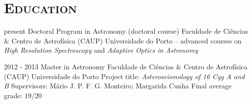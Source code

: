 \documentclass[10pt]{moderncv}
\begin{document}
%




\section{\textsc{Education}}

\cventry
	{present}
	{Doctoral Program in Astronomy (doctoral course)}
	{\newline Faculdade de Ciências \& Centro de Astrofísica (CAUP)}
	{Universidade do Porto}
	{\newline 
	-- advanced courses on \emph{High Resolution Spectroscopy} and \emph{Adaptive Optics in Astronomy}}
	{}  %


\cventry
	{2012 - 2013}
	{Master in Astronomy}
	{\newline Faculdade de Ciências \& Centro de Astrofísica (CAUP)}
	{Universidade do Porto}
	{\newline Project title: \emph{Asteroseismology of 16 Cyg A and B}
	\newline
	Supervisors: Mário J. P. F. G. Monteiro; Margarida Cunha}
	{Final average grade: $19$/$20$}  %


\end{document}
